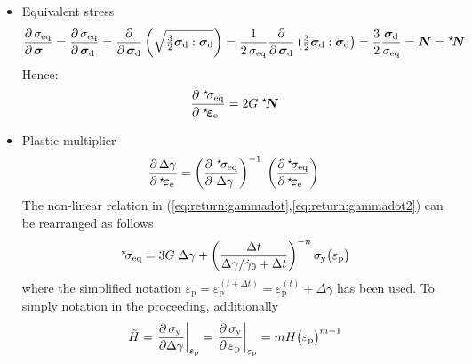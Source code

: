 \documentclass[times,namecite]{goose-article}
\newcommand\leftstar[1]{\hspace*{-.3em}~^\star\!#1}
\begin{document}
\begin{itemize}
%
\item Equivalent stress
\begin{equation}
\frac{\partial\, \sigma_\mathrm{eq} \hfill}{\partial\, \bm{\sigma} \hfill}
  = \frac{
    \partial\, \sigma_\mathrm{eq} \hfill
  }{
    \partial\, \bm{\sigma}_\mathrm{d} \hfill
  }
  = \frac{
    \partial
  }{
    \partial\, \bm{\sigma}_\mathrm{d}
  } \left(
    \sqrt{ \tfrac{3}{2} \bm{\sigma}_\mathrm{d} : \bm{\sigma}_\mathrm{d} }
  \right)
  = \frac{1}{2 \, \sigma_\mathrm{eq} }
  \frac{\partial}{\partial\, \bm{\sigma}_\mathrm{d}}
  \left(
    \tfrac{3}{2} \bm{\sigma}_\mathrm{d} : \bm{\sigma}_\mathrm{d}
  \right)
  = \frac{3}{2} \frac{\bm{\sigma}_\mathrm{d}}{\sigma_\mathrm{eq}}
  = \bm{N} = \leftstar{\bm{N}}
\end{equation}
Hence:
\begin{equation}
\frac{
    \partial \;\leftstar{\sigma}_\mathrm{eq} \hfill
  }{
    \partial \;\leftstar{\bm{\varepsilon}}_\mathrm{e} \hfill
  } =
  2 G \;\leftstar{\bm{N}}
\end{equation}
%
\item Plastic multiplier
\begin{align}
  \frac{
    \partial \,\Delta \gamma \hfill
  }{
    \partial \,\leftstar{\bm{\varepsilon}}_\mathrm{e}  \hfill
  }
  =
  \left( \frac{
    \partial ~\leftstar{\sigma}_\mathrm{eq} \hfill
  }{
    \partial ~\Delta \gamma      \hfill
  } \right)^{-1} \;
  \left( \frac{
    \partial \,\leftstar{\sigma}_\mathrm{eq} \hfill
  }{
    \partial \,\leftstar{\bm{\varepsilon}}_\mathrm{e} \hfill
  } \right) \;
\end{align}
The non-linear relation in (\ref{eq:return:gammadot},\ref{eq:return:gammadot2}) can be rearranged as follows
\begin{equation}
  \leftstar{\sigma}_\mathrm{eq}
  =
  3 G \; \Delta \gamma
  +
  \left( \frac{\Delta t}{ \Delta \gamma / \dot{\gamma}_0 + \Delta t} \right)^{-n}
  \sigma_\mathrm{y} \big( \varepsilon_\mathrm{p} \big)
\end{equation}
where the simplified notation $\varepsilon_\mathrm{p} = \varepsilon_\mathrm{p}^{(t + \Delta t)} = \varepsilon_\mathrm{p}^{(t)} + \Delta \gamma$ has been used. To simply notation in the proceeding, additionally
\begin{equation}
  \tilde{H} =
  \left.
  \frac{
    \partial\, \sigma_\mathrm{y} \hfill
  }{
    \partial   \Delta \gamma \hfill
  }
  \right|_{ \varepsilon_\mathrm{p} }
  =
  \left. \frac{
    \partial\, \sigma_\mathrm{y} \hfill
  }{
    \partial\, \varepsilon_\mathrm{p} \hfill
  } \right|_{ \varepsilon_\mathrm{p} }
  =
  m H \big( \varepsilon_\mathrm{p} \big)^{m - 1}
\end{equation}


\end{itemize}
\end{document}
